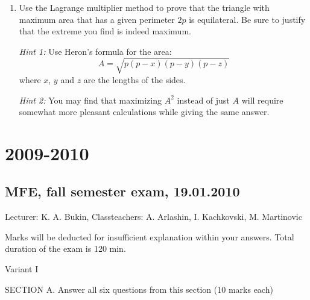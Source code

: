 \documentclass[12pt]{article} %
\theoremstyle{definition} %
\begin{document}
\begin{enumerate}[resume]
\item Use the Lagrange multiplier method to prove that the triangle with maximum area
that has a given perimeter $2p$ is equilateral. Be sure to justify that the extreme you find
is indeed maximum.


\textit{Hint 1:} Use Heron’s formula for the area:
\[
A=\sqrt{p(p - x)(p - y)(p - z)}
\]
where $x$, $y$ and $z$ are the lengths of the sides.


\textit{Hint 2:} You may find that maximizing $A^2$ instead of just $A$ will require somewhat more
pleasant calculations while giving the same answer.
\end{enumerate}

\section{2009-2010}

\subsection{MFE, fall semester exam, 19.01.2010}

Lecturer: K. A. Bukin, Classteachers: A. Arlashin, I. Kachkovski, M. Martinovic


Marks will be deducted for insufficient explanation within your answers. Total duration
of the exam is 120 min.


Variant I


SECTION A. Answer all six questions from this section (10 marks each)
\end{document}
